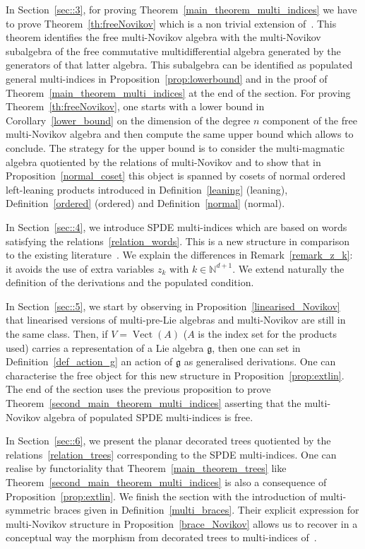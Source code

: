 \documentclass[AHL,Unicode,longabstracts]{cedram}
\newcommand*\fkg{\mathfrak{g}}
\newcommand{\bbN}{\mathbb{N}}
\DeclareMathOperator{\Vect}{Vect}
\begin{document}
In Section~\ref{sec::3}, for proving Theorem~\ref{main_theorem_multi_indices} we have to prove Theorem~\ref{th:freeNovikov} which is a non trivial extension of~\cite[Theorem~7.8]{DL}. This theorem identifies the free multi-Novikov algebra with the multi-Novikov subalgebra of the free commutative multidifferential algebra generated by the generators of that latter algebra. This subalgebra can be identified as populated general multi-indices in Proposition~\ref{prop:lowerbound} and in the proof of Theorem~\ref{main_theorem_multi_indices} at the end of the section. For proving Theorem~\ref{th:freeNovikov}, one starts with a lower bound in Corollary~\ref{lower_bound} on the dimension of the degree $n$ component of the free multi-Novikov algebra and then compute the same upper bound which allows to conclude. The strategy for the upper bound is to consider the multi-magmatic algebra quotiented by the relations of multi-Novikov and to show that in Proposition~\ref{normal_coset} this object is spanned by cosets of normal ordered left-leaning products introduced in Definition~\ref{leaning} (leaning), Definition~\ref{ordered} (ordered) and Definition~\ref{normal} (normal).

In Section~\ref{sec::4}, we introduce SPDE multi-indices which are based on words satisfying the relations~\eqref{relation_words}. This is a new structure in comparison to the existing literature~\cite{BL23,LOT,OSSW}. We explain the differences in Remark~\ref{remark_z_k}: it avoids the use of extra variables $z_{k}$ with $k \in \bbN^{d+1}$. We extend naturally the definition of the derivations and the populated condition.

In Section~\ref{sec::5}, we start by observing in Proposition~\ref{linearised_Novikov} that linearised versions of multi-pre-Lie algebras and multi-Novikov are still in the same class. Then, if $V=\Vect(A)$ ($ A $ is the index set for the products used) carries a representation of a Lie algebra $\fkg$, then one can set in Definition~\ref{def_action_g} an action of $\fkg$ as generalised derivations. One can characterise the free object for this new structure in Proposition~\ref{prop:extlin}. The end of the section uses the previous proposition to prove Theorem~\ref{second_main_theorem_multi_indices} asserting that the multi-Novikov algebra of populated SPDE multi-indices is free.


In Section~\ref{sec::6}, we present the planar decorated trees quotiented by the relations~\eqref{relation_trees} corresponding to the SPDE multi-indices. One can realise by functoriality that Theorem~\ref{main_theorem_trees} like Theorem~\ref{second_main_theorem_multi_indices} is also a consequence of Proposition~\ref{prop:extlin}. We finish the section with the introduction of multi-symmetric braces given in Definition~\ref{multi_braces}. Their explicit expression for multi-Novikov structure in Proposition~\ref{brace_Novikov} allows us to recover in a conceptual way the morphism from decorated trees to multi-indices of~\cite[Remark~5.6]{BK23}.
\end{document}
